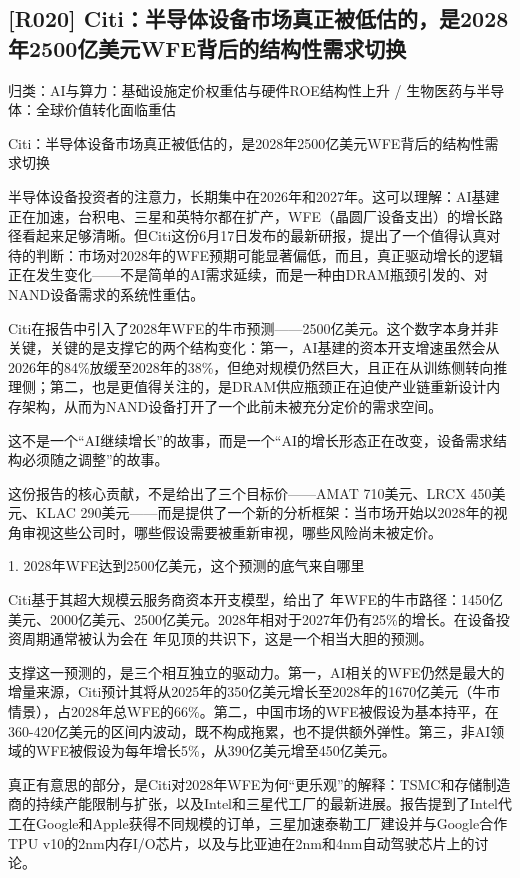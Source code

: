 \documentclass[11pt]{ctexart}
\begin{document}
\subsection{[R020] Citi：半导体设备市场真正被低估的，是2028年2500亿美元WFE背后的结构性需求切换}
{\small\color{refgray}归类：AI与算力：基础设施定价权重估与硬件ROE结构性上升 / 生物医药与半导体：全球价值转化面临重估}

Citi：半导体设备市场真正被低估的，是2028年2500亿美元WFE背后的结构性需求切换

半导体设备投资者的注意力，长期集中在2026年和2027年。这可以理解：AI基建正在加速，台积电、三星和英特尔都在扩产，WFE（晶圆厂设备支出）的增长路径看起来足够清晰。但Citi这份6月17日发布的最新研报，提出了一个值得认真对待的判断：市场对2028年的WFE预期可能显著偏低，而且，真正驱动增长的逻辑正在发生变化——不是简单的AI需求延续，而是一种由DRAM瓶颈引发的、对NAND设备需求的系统性重估。

Citi在报告中引入了2028年WFE的牛市预测——2500亿美元。这个数字本身并非关键，关键的是支撑它的两个结构变化：第一，AI基建的资本开支增速虽然会从2026年的84\%放缓至2028年的38\%，但绝对规模仍然巨大，且正在从训练侧转向推理侧；第二，也是更值得关注的，是DRAM供应瓶颈正在迫使产业链重新设计内存架构，从而为NAND设备打开了一个此前未被充分定价的需求空间。

这不是一个“AI继续增长”的故事，而是一个“AI的增长形态正在改变，设备需求结构必须随之调整”的故事。

这份报告的核心贡献，不是给出了三个目标价——AMAT 710美元、LRCX 450美元、KLAC 290美元——而是提供了一个新的分析框架：当市场开始以2028年的视角审视这些公司时，哪些假设需要被重新审视，哪些风险尚未被定价。

1. 2028年WFE达到2500亿美元，这个预测的底气来自哪里

Citi基于其超大规模云服务商资本开支模型，给出了 年WFE的牛市路径：1450亿美元、2000亿美元、2500亿美元。2028年相对于2027年仍有25\%的增长。在设备投资周期通常被认为会在 年见顶的共识下，这是一个相当大胆的预测。

支撑这一预测的，是三个相互独立的驱动力。第一，AI相关的WFE仍然是最大的增量来源，Citi预计其将从2025年的350亿美元增长至2028年的1670亿美元（牛市情景），占2028年总WFE的66\%。第二，中国市场的WFE被假设为基本持平，在360-420亿美元的区间内波动，既不构成拖累，也不提供额外弹性。第三，非AI领域的WFE被假设为每年增长5\%，从390亿美元增至450亿美元。

真正有意思的部分，是Citi对2028年WFE为何“更乐观”的解释：TSMC和存储制造商的持续产能限制与扩张，以及Intel和三星代工厂的最新进展。报告提到了Intel代工在Google和Apple获得不同规模的订单，三星加速泰勒工厂建设并与Google合作TPU v10的2nm内存I/O芯片，以及与比亚迪在2nm和4nm自动驾驶芯片上的讨论。
\end{document}
